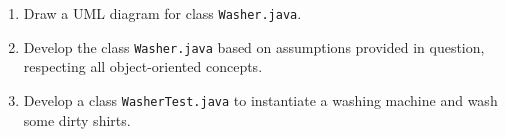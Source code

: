 \documentclass[12pt,letterpaper,twoside]{article}
\begin{document}
\begin{enumerate}[label=(\alph*)]\itemsep=0pt
	\item Draw a UML diagram for class \texttt{Washer.java}.
	\item Develop the class \texttt{Washer.java} based on assumptions provided in question, respecting all object-oriented concepts.
	\item Develop a class \texttt{WasherTest.java} to instantiate a washing machine and wash some dirty shirts.
\end{enumerate}

\end{document}
